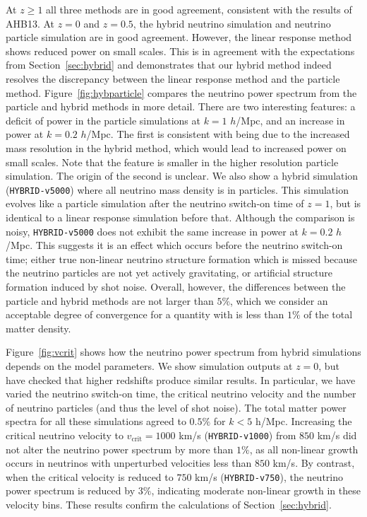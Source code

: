 \documentclass[useAMS, usenatbib]{mnras}
\begin{document}
At $z \geq 1$ all three methods are in good agreement, consistent with the results of AHB13. At $z = 0$ and $z=0.5$, the hybrid neutrino simulation and neutrino particle simulation are in good agreement. However, the linear response method shows reduced power on small scales. This is in agreement with the expectations from Section~\ref{sec:hybrid} and demonstrates that our hybrid method indeed resolves the discrepancy between the linear response method and the particle method. Figure~\ref{fig:hybparticle} compares the neutrino power spectrum from the particle and hybrid methods in more detail. There are two interesting features: a deficit of power in the particle simulations at $k=1$ $h$/Mpc, and an increase in power at $k=0.2$ $h$/Mpc. The first is consistent with being due to the increased mass resolution in the hybrid method, which would lead to increased power on small scales. Note that the feature is smaller in the higher resolution particle simulation. The origin of the second is unclear. We also show a hybrid simulation (\texttt{HYBRID-v5000}) where all neutrino mass density is in particles. This simulation evolves like a particle simulation after the neutrino switch-on time of $z=1$, but is identical to a linear response simulation before that. Although the comparison is noisy, \texttt{HYBRID-v5000} does not exhibit the same increase in power at $k=0.2$ $h$/Mpc. This suggests it is an effect which occurs before the neutrino switch-on time; either true non-linear neutrino structure formation which is missed because the neutrino particles are not yet actively gravitating, or artificial structure formation induced by shot noise. Overall, however, the differences between the particle and hybrid methods are not larger than $5\%$, which we consider an acceptable degree of convergence for a quantity with is less than $1\%$ of the total matter density.

Figure~\ref{fig:vcrit} shows how the neutrino power spectrum from hybrid simulations depends on the model parameters. We show simulation outputs at $z=0$, but have checked that higher redshifts produce similar results. In particular, we have varied the neutrino switch-on time, the critical neutrino velocity and the number of neutrino particles (and thus the level of shot noise). The total matter power spectra for all these simulations agreed to $0.5\%$ for $k < 5$ h/Mpc. Increasing the critical neutrino velocity to $v_\mathrm{crit} = 1000$ km/s (\texttt{HYBRID-v1000}) from $850$ km/s did not alter the neutrino power spectrum by more than $1\%$, as all non-linear growth occurs in neutrinos with unperturbed velocities less than $850$ km/s. By contrast, when the critical velocity is reduced to $750$ km/s (\texttt{HYBRID-v750}), the neutrino power spectrum is reduced by $3\%$, indicating moderate non-linear growth in these velocity bins. These results confirm the calculations of Section~\ref{sec:hybrid}.
\end{document}
